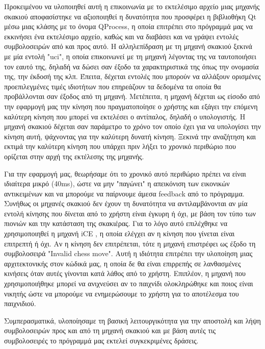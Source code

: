 Προκειμένου να υλοποιηθεί αυτή η επικοινωνία με το εκτελέσιμο αρχείο μιας μηχανής σκακιού αποφασίστηκε να αξιοποιηθεί η δυνατότητα που προσφέρει η βιβλιοθήκη Qt μέσω μιας κλάσης με το όνομα QProcess, η οποία επιτρέπει στο πρόγραμμά μας να εκκινήσει ένα εκτελέσιμο αρχείο, καθώς και να διαβάσει και να γράψει εντολές συμβολοσειρών από και προς αυτό. Η αλληλεπίδραση με τη μηχανή σκακιού ξεκινά με μία εντολή "uci", η οποία επικοινωνεί με τη μηχανή λέγοντας της να ταυτοποιήσει τον εαυτό της, δηλαδή να δώσει σαν έξοδο τα χαρακτηριστικά της όπως την ονομασία της, την έκδοσή της κλπ.  Έπειτα, δέχεται εντολές που μπορούν να αλλάξουν ορισμένες προεπιλεγμένες τιμές ιδιοτήτων που επηρεάζουν τα δεδομένα τα οποία θα προβάλλονται σαν έξοδος από τη μηχανή. Μετέπειτα, η μηχανή δέχεται ως είσοδο από την εφαρμογή μας την κίνηση που πραγματοποίησε ο χρήστης και εξάγει την επόμενη καλύτερη κίνηση που μπορεί να εκτελέσει ο αντίπαλος, δηλαδή ο υπολογιστής.
Η μηχανή σκακιού δέχεται σαν παράμετρο το χρόνο τον οποίο έχει για να υπολογίσει την κίνηση αυτή, ψάχνοντας για την καλύτερη δυνατή κίνηση. Ξεκινά την αναζήτηση και εκτιμά την καλύτερη κίνηση που υπάρχει πριν λήξει το χρονικό περιθώριο που ορίζεται στην αρχή της εκτέλεσης της μηχανής. 

Για την εφαρμογή μας, θεωρήσαμε ότι το χρονικό αυτό περιθώριο πρέπει να είναι ιδιαίτερα μικρό (40ms), ώστε να μην "παγώνει" η απεικόνιση των εικονικών αντικειμένων και να μπορούμε να παίρνουμε άμεσα feedback από το πρόγραμμα. Συνήθως οι μηχανές σκακιού δεν έχουν τη δυνατότητα να αντιλαμβάνονται αν μία εντολή κίνησης που δίνεται από το χρήστη είναι έγκυρη ή όχι, με βάση τον τύπο των πιονιών και την κατάσταση της σκακιέρας. Για το λόγο αυτό επιλέχθηκε να χρησιμοποιηθεί η μηχανή iCE \cite{ice}, η οποία ελέγχει αν η κίνηση που γίνεται είναι επιτρεπτή ή όχι. Αν η κίνηση δεν επιτρέπεται, τότε η μηχανή επιστρέφει ως έξοδο τη συμβολοσειρά "Invalid chess move". Αυτή η ιδιότητα επιτρέπει την υλοποίηση μιας αρχιτεκτονικής στον κώδικά μας, η οποία δε θα είναι επιρρεπής σε λανθασμένες κινήσεις όταν αυτές γίνονται κατά λάθος από το χρήστη. Επιπλέον, η μηχανή που χρησιμοποιήθηκε μπορεί να ανιχνεύσει αν το παιχνίδι ολοκληρώθηκε και ποιος είναι νικητής ώστε να μπορούμε να ενημερώσουμε το χρήστη για το αποτέλεσμα του παιχνιδιού. 

Συμπερασματικά, υλοποίησαμε τη βασική λειτουργικότητα για την αποστολή και λήψη συμβολοσειρών προς και από τη μηχανή σκακιού και με βάση αυτές τις συμβολοσειρές το πρόγραμμά μας εκτελεί συγκεκριμένες δράσεις.






